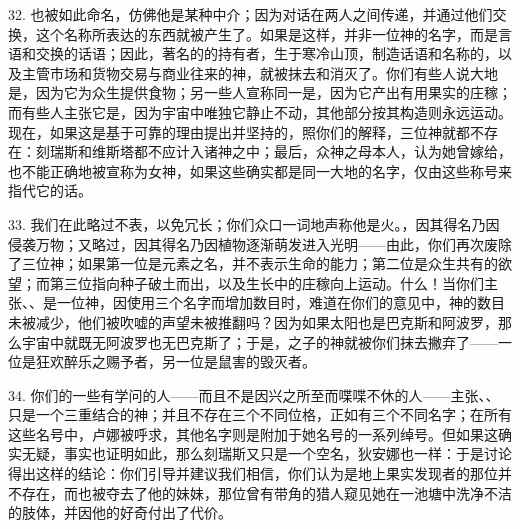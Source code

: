 32. 也被如此命名，仿佛他是某种中介；因为对话在两人之间传递，并通过他们交换，这个名称所表达的东西就被产生了。如果是这样，并非一位神的名字，而是言语和交换的话语；因此，著名的的持有者，生于寒冷山顶，制造话语和名称的，以及主管市场和货物交易与商业往来的神，就被抹去和消灭了。你们有些人说大地是，因为它为众生提供食物；另一些人宣称同一是，因为它产出有用果实的庄稼；而有些人主张它是，因为宇宙中唯独它静止不动，其他部分按其构造则永远运动。现在，如果这是基于可靠的理由提出并坚持的，照你们的解释，三位神就都不存在：刻瑞斯和维斯塔都不应计入诸神之中；最后，众神之母本人，认为她曾嫁给，也不能正确地被宣称为女神，如果这些确实都是同一大地的名字，仅由这些称号来指代它的话。\par

33. 我们在此略过不表，以免冗长；你们众口一词地声称他是火。，因其得名乃因侵袭万物；又略过，因其得名乃因植物逐渐萌发进入光明——由此，你们再次废除了三位神；如果第一位是元素之名，并不表示生命的能力；第二位是众生共有的欲望；而第三位指向种子破土而出，以及生长中的庄稼向上运动。什么！当你们主张、、是一位神，因使用三个名字而增加数目时，难道在你们的意见中，神的数目未被减少，他们被吹嘘的声望未被推翻吗？因为如果太阳也是巴克斯和阿波罗，那么宇宙中就既无阿波罗也无巴克斯了；于是，之子的神就被你们抹去撇弃了——一位是狂欢醉乐之赐予者，另一位是鼠害的毁灭者。\par

34. 你们的一些有学问的人——而且不是因兴之所至而喋喋不休的人——主张、、只是一个三重结合的神；并且不存在三个不同位格，正如有三个不同名字；在所有这些名号中，卢娜被呼求，其他名字则是附加于她名号的一系列绰号。但如果这确实无疑，事实也证明如此，那么刻瑞斯又只是一个空名，狄安娜也一样：于是讨论得出这样的结论：你们引导并建议我们相信，你们认为是地上果实发现者的那位并不存在，而也被夺去了他的妹妹，那位曾有带角的猎人窥见她在一池塘中洗净不洁的肢体，并因他的好奇付出了代价。\par

